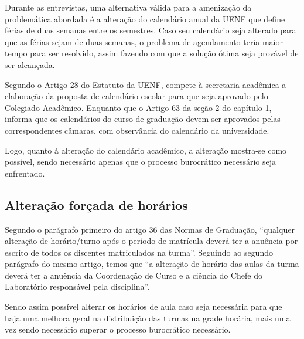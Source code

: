Durante as entrevistas, uma alternativa válida para a amenização da problemática abordada é a alteração do calendário anual da UENF que define férias de duas semanas entre os semestres. Caso seu calendário seja alterado para que as férias sejam de duas semanas, o problema de agendamento teria maior tempo para ser resolvido, assim fazendo com que a solução ótima seja provável de ser alcançada.


Segundo o Artigo 28 do Estatuto da UENF, compete à secretaria acadêmica a elaboração da proposta de calendário escolar para que seja aprovado pelo Colegiado Acadêmico. Enquanto que o Artigo 63 da seção 2 do capítulo 1, informa que os calendários do curso de graduação devem ser aprovados pelas correspondentes câmaras, com observância do calendário da universidade.

Logo, quanto à alteração do calendário acadêmico, a alteração mostra-se como possível, sendo necessário apenas que o processo burocrático necessário seja enfrentado.

\subsection{Alteração forçada de horários} %

Segundo o parágrafo primeiro do artigo 36 das Normas de Graduação, ``qualquer alteração de horário/turno após o período de matrícula deverá ter a anuência por escrito de todos os discentes matriculados na turma''. Seguindo ao segundo parágrafo do mesmo artigo, temos que ``a alteração de horário das aulas da turma deverá ter a anuência da Coordenação de Curso e a ciência do Chefe do Laboratório responsável pela disciplina''.

Sendo assim possível alterar os horários de aula caso seja necessária para que haja uma melhora geral na distribuição das turmas na grade horária, mais uma vez sendo necessário superar o processo burocrático necessário.
